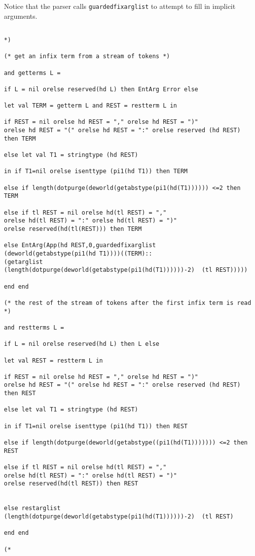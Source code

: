 \documentclass{article}
\begin{document}
Notice that the parser calls {\tt guardedfixarglist} to attempt to fill in implicit arguments.

\begin{verbatim}

*)

(* get an infix term from a stream of tokens *)

and getterms L = 

if L = nil orelse reserved(hd L) then EntArg Error else

let val TERM = getterm L and REST = restterm L in

if REST = nil orelse hd REST = "," orelse hd REST = ")" 
orelse hd REST = "(" orelse hd REST = ":" orelse reserved (hd REST) then TERM

else let val T1 = stringtype (hd REST)

in if T1=nil orelse isenttype (pi1(hd T1)) then TERM

else if length(dotpurge(deworld(getabstype(pi1(hd(T1)))))) <=2 then TERM

else if tl REST = nil orelse hd(tl REST) = "," 
orelse hd(tl REST) = ":" orelse hd(tl REST) = ")" 
orelse reserved(hd(tl(REST))) then TERM

else EntArg(App(hd REST,0,guardedfixarglist 
(deworld(getabstype(pi1(hd T1))))((TERM)::
(getarglist 
(length(dotpurge(deworld(getabstype(pi1(hd(T1))))))-2)  (tl REST)))))

end end

(* the rest of the stream of tokens after the first infix term is read *)

and restterms L =  

if L = nil orelse reserved(hd L) then L else

let val REST = restterm L in

if REST = nil orelse hd REST = "," orelse hd REST = ")" 
orelse hd REST = "(" orelse hd REST = ":" orelse reserved (hd REST) then REST

else let val T1 = stringtype (hd REST)

in if T1=nil orelse isenttype (pi1(hd T1)) then REST

else if length(dotpurge(deworld(getabstype((pi1(hd(T1))))))) <=2 then REST

else if tl REST = nil orelse hd(tl REST) = "," 
orelse hd(tl REST) = ":" orelse hd(tl REST) = ")" 
orelse reserved(hd(tl REST)) then REST


else restarglist (length(dotpurge(deworld(getabstype(pi1(hd(T1))))))-2)  (tl REST)

end end

(*

\end{verbatim}
\end{document}
